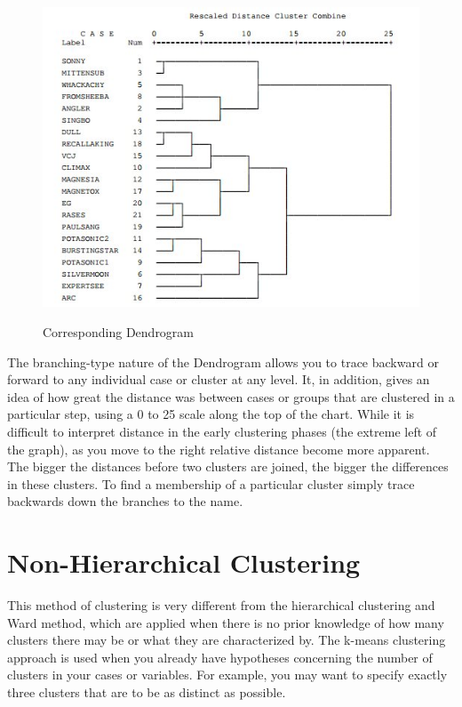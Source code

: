 \documentclass[a4paper,12pt]{article}
\begin{document}
\begin{figure}
	\includegraphics[scale=1.0]{images/Dendro}\\
	\caption{Corresponding Dendrogram}
\end{figure}

The branching-type nature of the Dendrogram allows you to trace backward or forward to any individual
case or cluster at any level. It, in addition, gives an idea of how great the distance was between cases or
groups that are clustered in a particular step, using a 0 to 25 scale along the top of the chart. While it is
difficult to interpret distance in the early clustering phases (the extreme left of the graph), as you move to
the right relative distance become more apparent. The bigger the distances before two clusters are joined,
the bigger the differences in these clusters. To find a membership of a particular cluster simply trace
backwards down the branches to the name.

\newpage
\section{Non-Hierarchical Clustering}
This method of clustering is very different from the hierarchical clustering and Ward method, which are applied when there is no prior knowledge of how many clusters there may be or what they are characterized by. The k-means clustering approach is used when you already have hypotheses concerning the number of clusters in your cases or variables. For example, you may want to specify exactly three clusters that are to be as distinct as possible.
\end{document}
